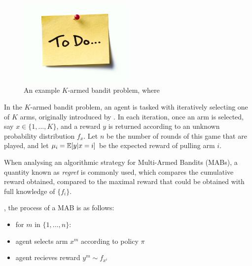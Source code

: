     \begin{figure}
        \centering\includegraphics[width=0.5\textwidth]{figures/todo.jpg} 
        \caption[An example $K$-armed bandit problem.]{An example $K$-armed bandit problem, where }
        \label{fig:mab_example}
    \end{figure}




    In the $K$-armed bandit problem, an agent is tasked with iteratively selecting one of $K$ arms, originally introduced by  . In each iteration, once an arm is selected, say $x\in\{1,...,K\}$, and a reward $y$ is returned according to an unknown probability distribution $f_x$. Let $n$ be the number of rounds of this game that are played, and let $\mu_i=\mathbb{E}[y|x=i]$ be the expected reward of pulling arm $i$. 
    
    When analysing an algorithmic strategy for Multi-Armed Bandits (MABs), a quantity known as \textit{regret} is commonly used, which compares the cumulative reward obtained, compared to the maximal reward that could be obtained with full knowledge of $\{f_i\}$.


    , the process of a MAB is as follows:
    \begin{itemize}
        \item for $m$ in $\{1,...,n\}$:
        \item agent selects arm $x^m$ according to policy $\pi$
        \item agent recieves reward $y^m \sim f_{x^i}$
    \end{itemize}

